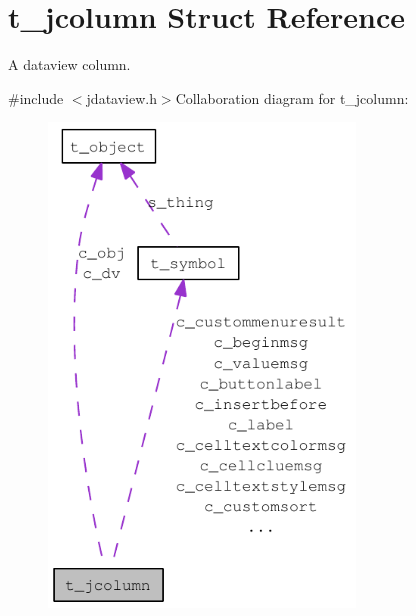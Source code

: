 \hypertarget{structt__jcolumn}{
\section{t\_\-jcolumn Struct Reference}
\label{structt__jcolumn}
}


A dataview column.  


{\ttfamily \#include $<$jdataview.h$>$}Collaboration diagram for t\_\-jcolumn:\nopagebreak
\begin{figure}[H]
\begin{center}
\leavevmode
\includegraphics[width=231pt]{structt__jcolumn__coll__graph}
\end{center}
\end{figure}
